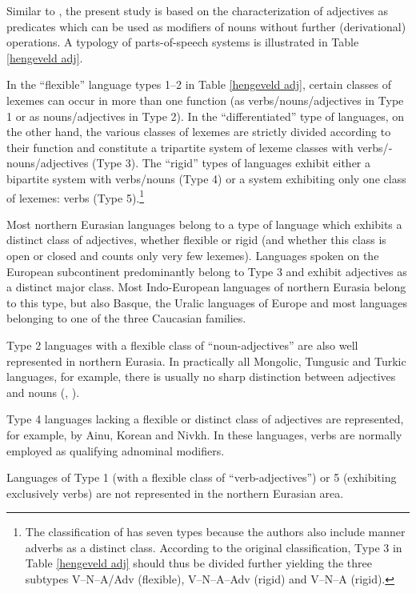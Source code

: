 Similar to \cite{hengeveld-etal2004}, the present study is based on the characterization of adjectives as predicates which can be used as modifiers of nouns without further (derivational) operations. A typology of parts-of-speech systems is illustrated in Table \ref{hengeveld adj}.

In the “flexible” language types 1–2 in Table \ref{hengeveld adj}, certain classes of lexemes can occur in more than one function (as verbs/nouns/adjectives in Type 1 or as nouns/adjectives in Type 2). In the “differentiated” type of languages, on the other hand, the various classes of lexemes are strictly divided according to their function and constitute a tripartite system of lexeme classes with verbs\fshyp{}nouns\fshyp{}adjectives (Type 3). The “rigid” types of languages exhibit either a bipartite system with verbs/nouns (Type 4) or a system exhibiting only one class of lexemes: verbs (Type 5).\footnote{The classification of \citealt{hengeveld-etal2004} has seven types because the authors also include manner adverbs as a distinct class. According to the original classification, Type 3 in Table \ref{hengeveld adj} should thus be divided further yielding the three subtypes V–N–A/Adv (flexible), V–N–A–Adv (rigid) and V–N–A (rigid).} 

Most northern Eurasian languages belong to a type of language which exhibits a distinct class of adjectives, whether flexible or rigid (and whether this class is open or closed and counts only very few lexemes). Languages spoken on the European subcontinent predominantly belong to Type 3 and exhibit adjectives as a distinct major class. Most Indo-European languages of northern Eurasia belong to this type, but also Basque, the Uralic languages of Europe and most languages belonging to one of the three Caucasian families. 

Type 2 languages with a flexible class of “noun-adjectives” are also well represented in northern Eurasia. In practically all Mongolic, Tungusic and Turkic languages, for example, there is usually no sharp distinction between adjectives and nouns (\citealt[122–123]{rijkhoff2002}, \citealt[9]{poppe1964}).

Type 4 languages lacking a flexible or distinct class of adjectives are represented, for example, by Ainu, Korean and Nivkh. In these languages, verbs are normally employed as qualifying adnominal modifiers.

Languages of Type 1 (with a flexible class of “verb-adjectives”) or 5 (exhibiting exclusively verbs) are not represented in the northern Eurasian area.

